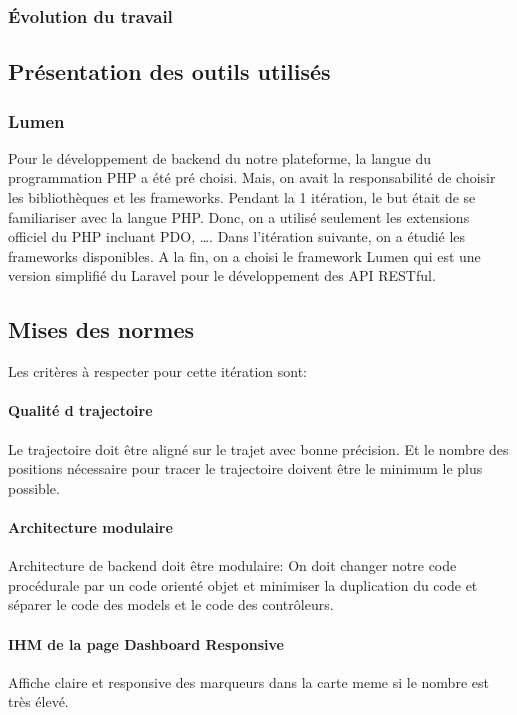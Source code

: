 \subsubsection{Évolution du travail}

\subsection{Présentation des outils utilisés}

\subsubsection{Lumen}

Pour le développement de backend du notre plateforme, la langue du
programmation PHP a été pré choisi. Mais, on avait la responsabilité de choisir
les bibliothèques et les frameworks. Pendant la 1\iere{} itération, le but
était de se familiariser avec la langue PHP\@. Donc, on a utilisé seulement les
extensions officiel du PHP incluant PDO, \ldots. Dans l'itération suivante, on
a étudié les frameworks disponibles. A la fin, on a choisi le framework Lumen
qui est une version simplifié du Laravel pour le développement des API
\acrshort{RESTful}.


\subsection{Mises des normes}

Les critères à respecter pour cette itération sont:

\paragraph{Qualité d trajectoire}
Le trajectoire doit être aligné sur le trajet avec bonne précision. Et le
nombre des positions nécessaire pour tracer le trajectoire doivent être le
minimum le plus possible.

\paragraph{Architecture modulaire}
Architecture de backend doit être modulaire: On doit changer notre code
procédurale par un code orienté objet et minimiser la duplication du code et
séparer le code des models et le code des contrôleurs.

\paragraph{IHM de la page Dashboard Responsive}
Affiche claire et responsive des marqueurs dans la carte meme si le nombre est
très élevé.

